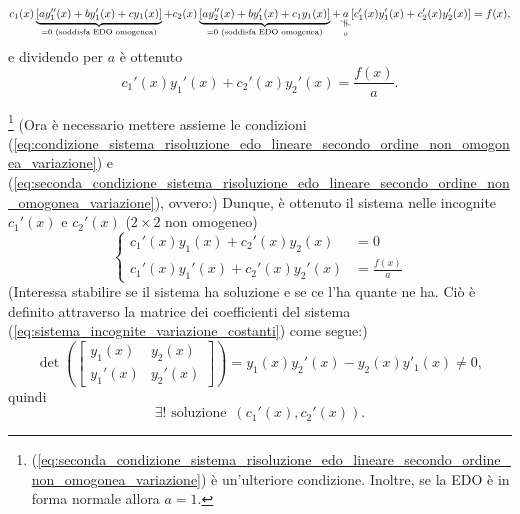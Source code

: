 \begin{equation*}
	c_1(x)\underbrace{[ay_1''(x) + b y_1'(x) + c y_1(x)]}_{ = 0\text{ (soddisfa EDO omogenea)}} + c_2(x) \underbrace{[ay_2''(x) + b y_1'(x) + c_1 y_1(x)]}_{ = 0\text{ (soddisfa EDO omogenea)}} + \underset{\underset{0}{\vertneq}}{a} [c_1'(x) y_1'(x) + c_2'(x)y_2'(x)] = f(x),
\end{equation*}
e dividendo per $a$ è ottenuto
\begin{equation}\label{eq:seconda_condizione_sistema_risoluzione_edo_lineare_secondo_ordine_non_omogonea_variazione}
	c_1'(x) y_1'(x) + c_2'(x) y_2'(x) = \frac{f(x)}{a}.
\end{equation}


\noindent \footnote{(\ref{eq:seconda_condizione_sistema_risoluzione_edo_lineare_secondo_ordine_non_omogonea_variazione}) è un'ulteriore condizione. Inoltre, se la EDO è in forma normale allora $a=1$.} (Ora è necessario mettere assieme le condizioni (\ref{eq:condizione_sistema_risoluzione_edo_lineare_secondo_ordine_non_omogonea_variazione}) e (\ref{eq:seconda_condizione_sistema_risoluzione_edo_lineare_secondo_ordine_non_omogonea_variazione}), ovvero:) Dunque, è ottenuto il sistema nelle incognite $c_1'(x)$ e $c_2'(x)$ ($2\times 2$ non omogeneo)
\begin{equation}\label{eq:sistema_incognite_variazione_costanti}
	\begin{cases}
		c_1'(x) y_1(x) + c_2'(x) y_2(x) &= 0\\
		c_1'(x) y_1'(x) + c_2'(x) y_2'(x) &= \frac{f(x)}{a}
	\end{cases}
\end{equation}
(Interessa stabilire se il sistema ha soluzione e se ce l'ha quante ne ha. Ciò è definito attraverso la matrice dei coefficienti del sistema (\ref{eq:sistema_incognite_variazione_costanti}) come segue:)
\begin{equation}\label{eq:simil_wronskiana_metodo_variazione_costanti}
	\det\left(\begin{bmatrix}
		y_1(x) & y_2(x)\\
		y_1'(x) & y_2'(x)
	\end{bmatrix}\right) = y_1(x)y_2'(x)- y_2(x) y'_1(x) \neq 0,
\end{equation}
quindi
\begin{equation}\label{eq:soluzione_sistema_condizioni}
	\exists! \text{ soluzione } \, (c_1'(x),c_2'(x)).
\end{equation}

